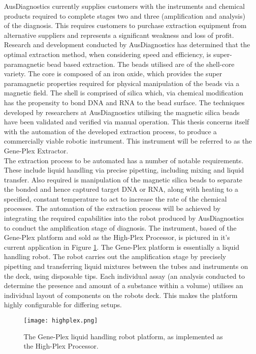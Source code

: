 AusDiagnostics currently supplies customers with the instruments and chemical products required to complete stages two and three (amplification and analysis) of the diagnosis. This requires customers to purchase extraction equipment from alternative suppliers and represents a significant weakness and loss of profit. Research and development conducted by AusDiagnostics has determined that the optimal extraction method, when considering speed and efficiency, is super-paramagnetic bead based extraction. The beads utilised are of the shell-core variety. The core is composed of an iron oxide, which provides the super paramagnetic properties required for physical manipulation of the beads via a magnetic field. The shell is comprised of silica which, via chemical modification has the propensity to bond DNA and RNA to the bead surface. The techniques developed by researchers at AusDiagnostics utilising the magnetic silica beads have been validated and verified via manual operation. This thesis concerns itself with the automation of the developed extraction process, to produce a commercially viable robotic instrument. This instrument will be referred to as the Gene-Plex Extractor.\\

The extraction process to be automated has a number of notable requirements. These include liquid handling via precise pipetting, including mixing and liquid transfer. Also required is manipulation of the magnetic silica beads to separate the bonded and hence captured target DNA or RNA, along with heating to a specified, constant temperature to act to increase the rate of the chemical processes. The automation of the extraction process will be achieved by integrating the required capabilities into the robot produced by AusDiagnostics to conduct the amplification stage of diagnosis. The instrument, based of the Gene-Plex platform and sold as the High-Plex Processor, is pictured in it's current application in Figure \ref{fig:highplex}. The Gene-Plex platform is essentially a liquid handling robot. The robot carries out the amplification stage by precisely pipetting and transferring liquid mixtures between the tubes and instruments on the deck, using disposable tips. Each individual assay (an analysis conducted to determine the presence and amount of a substance within a volume) utilises an individual layout of components on the robots deck. This makes the platform highly configurable for differing setups.

\begin{figure}[!htb]
	\centering
	\texttt{[image: highplex.png]}
	\caption[High-Plex Platform.]{The Gene-Plex liquid handling robot platform, as implemented as the High-Plex Processor.}
	\label{fig:highplex}
\end{figure} 
\FloatBarrier

